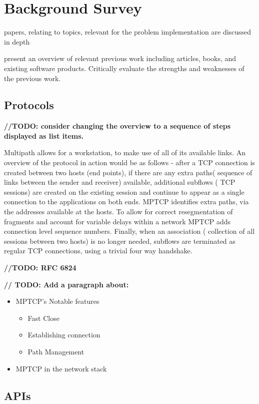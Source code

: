 \documentclass{mprop}
\begin{document}
\section{Background Survey}

papers, relating to topics, relevant for the problem implementation are discussed in depth


present an overview of relevant previous work including articles, books, and existing software products. Critically evaluate the strengths and weaknesses of the previous work.

\subsection{Protocols}

\textbf{//TODO: consider changing the overview to a sequence of steps displayed as list items.
}

\qquad Multipath allows for a workstation, to make use of all of its available links. An overview of the protocol in action would be as follows -  after a TCP connection is created between two hosts (end points), if there are any extra paths( sequence of links between the sender and receiver) available, additional subflows ( TCP sessions) are created on the existing session and continue to appear as a single connection to the applications on both ends. MPTCP identifies extra paths, via the addresses available at the hosts. To allow for correct resegmentation of fragments and account for variable delays within a network MPTCP adds connection level sequence numbers. Finally, when an association ( collection of all sessions between two hosts) is no longer needed, subflows are terminated as regular TCP connections, using a trivial four way handshake.


\textbf{//TODO: RFC 6824
}

\textbf{// TODO: Add a paragraph about:}
\begin{itemize}
\item MPTCP’s Notable features
  \begin{itemize}
  \item Fast Close
  \item Establishing connection
  \item Path Management
  \end{itemize}
\item MPTCP in the network stack
\end{itemize}
 



\subsection{APIs}
\end{document}
